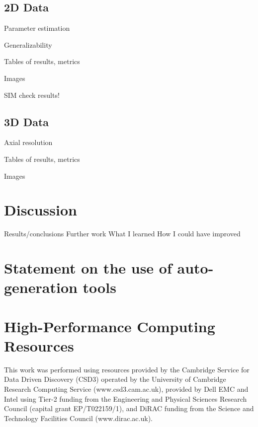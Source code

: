 \documentclass[12pt]{article}
\begin{document}
\subsection{2D Data}

Parameter estimation

Generalizability

Tables of results, metrics

Images

SIM check results!

\subsection{3D Data}

Axial resolution

Tables of results, metrics

Images

\section{Discussion}
Results/conclusions
Further work
What I learned
How I could have improved




\appendix

\section{Statement on the use of auto-generation tools}

\section {High-Performance Computing Resources}

This work was performed using resources provided by the Cambridge Service for Data Driven Discovery (CSD3) operated by the University of Cambridge Research Computing Service (www.csd3.cam.ac.uk),
provided by Dell EMC and Intel using Tier-2 funding from the Engineering and Physical Sciences Research Council (capital grant EP/T022159/1),
and DiRAC funding from the Science and Technology Facilities Council (www.dirac.ac.uk).
\end{document}

